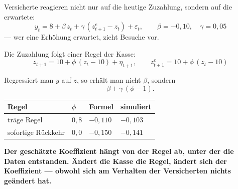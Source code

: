 \begin{merksatz}
Versicherte reagieren nicht nur auf die heutige Zuzahlung, sondern auf die erwartete:
\[ y_t = 8 + \beta\,z_t + \gamma\,(z^{e}_{t+1} - z_t) + \varepsilon_t , \qquad \beta = -0{,}10,\quad \gamma = 0{,}05 \]
--- wer eine Erhöhung erwartet, zieht Besuche vor.

Die Zuzahlung folgt einer Regel der Kasse:
\[ z_{t+1} = 10 + \phi\,(z_t - 10) + \eta_{t+1}, \qquad z^{e}_{t+1} = 10 + \phi\,(z_t-10) \]

Regressiert man $y$ auf $z$, so erhält man nicht $\beta$, sondern
\[ \beta + \gamma\,(\phi - 1) . \]

\begin{center}
{\small
\renewcommand{\arraystretch}{1.48}
\begin{tabular}{@{}P{2.8cm}P{1.4cm}P{2.0cm}P{2.0cm}@{}}
\toprule
\textbf{Regel} & $\phi$ & \textbf{Formel} & \textbf{simuliert}\\
\midrule
träge Regel & $0{,}8$ & $-0{,}110$ & $-0{,}103$\\
sofortige Rückkehr & $0{,}0$ & $-0{,}150$ & $-0{,}141$\\
\bottomrule
\end{tabular}}
\end{center}

\begin{center}
\begin{minipage}{0.9\textwidth}
\textbf{Der geschätzte Koeffizient hängt von der Regel ab, unter der die Daten entstanden. Ändert die Kasse die Regel, ändert sich der Koeffizient --- obwohl sich am Verhalten der Versicherten nichts geändert hat.}
\end{minipage}
\end{center}
\end{merksatz}

